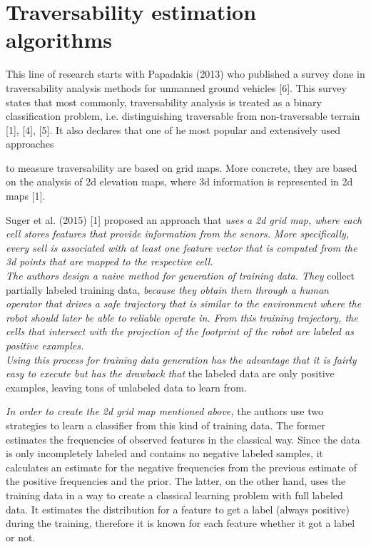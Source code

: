\documentclass[12pt,a4paper]{report}
\begin{document}
\section{Traversability estimation algorithms}

This line of research starts with Papadakis (2013)
who published a survey done in traversability analysis methods for
unmanned ground vehicles [6]. This survey states that most commonly,
traversability analysis is treated as a binary classification problem,
i.e. distinguishing traversable from non-traversable terrain [1], [4],
[5]. It also declares that one of he most popular and extensively used
approaches
        
	to measure traversability are based on grid 
	maps. More concrete, they are based on the analysis of 2d elevation maps, 
	where 3d information is represented in 2d maps [1].

        
	Suger et al. (2015) [1] proposed an approach that \textit{uses a 2d grid map, where 
	each cell stores features that provide information from the senors. More 
	specifically, every sell is associated with at least one feature vector that is 
	computed from the 3d points that are mapped to the respective cell.
	\\
	The authors design a naive method for generation of training data. They} 
	collect partially labeled training data, \textit{because they obtain them through a 
	human operator that drives a safe trajectory that is similar to the 
	environment where the robot should later be able to reliable operate	in. From this 
	training trajectory, the cells that intersect with the projection of the footprint 
	of the robot are labeled as positive examples. 
	\\
	Using this process for training data generation has the advantage that it 
	is fairly easy to execute but has the drawback that} the labeled data are only 
	positive examples, leaving tons of unlabeled data to learn from.
	
	\textit{In order to create the 2d grid map mentioned above,} the authors use two strategies to learn a classifier from this kind of 
	training data. The former estimates the frequencies of observed	features in the 
	classical way. Since the data is only incompletely labeled and contains no 
	negative labeled samples, it calculates an estimate for the negative 
	frequencies from the previous estimate of the positive frequencies and the prior. The 
	latter, on the other hand, uses the training data in a way to create a classical 
	learning problem with full labeled data. It estimates the distribution for a 
	feature to get a label (always positive) during the training, therefore it is 
	known for each feature whether it got a label or not.
	\newline
\end{document}
